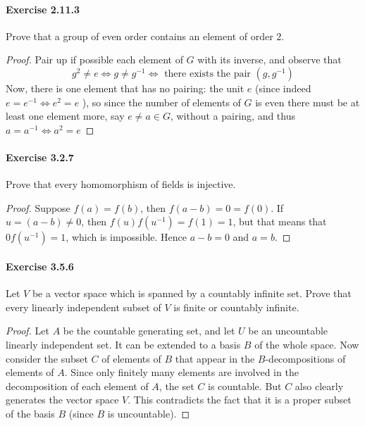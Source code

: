 \documentclass{article}
\begin{document}
\paragraph{Exercise 2.11.3} Prove that a group of even order contains an element of order $2 .$
\begin{proof}
    Pair up if possible each element of $G$ with its inverse, and observe that
$$
g^2 \neq e \Longleftrightarrow g \neq g^{-1} \Longleftrightarrow \text { there exists the pair }\left(g, g^{-1}\right)
$$
Now, there is one element that has no pairing: the unit $e$ (since indeed $e=e^{-1} \Longleftrightarrow e^2=e$ ), so since the number of elements of $G$ is even there must be at least one element more, say $e \neq a \in G$, without a pairing, and thus $a=a^{-1} \Longleftrightarrow a^2=e$
\end{proof}



\paragraph{Exercise 3.2.7} Prove that every homomorphism of fields is injective.
\begin{proof}
    Suppose $f(a)=f(b)$, then $f(a-b)=0=f(0)$. If $u=(a-b) \neq 0$, then $f(u) f\left(u^{-1}\right)=f(1)=1$, but that means that $0 f\left(u^{-1}\right)=1$, which is impossible. Hence $a-b=0$ and $a=b$.
\end{proof}



\paragraph{Exercise 3.5.6} Let $V$ be a vector space which is spanned by a countably infinite set. Prove that every linearly independent subset of $V$ is finite or countably infinite.
\begin{proof}
    Let $A$ be the countable generating set, and let $U$ be an uncountable linearly independent set. It can be extended to a basis $B$ of the whole space. Now consider the subset $C$ of elements of $B$ that appear in the $B$-decompositions of elements of $A$.
Since only finitely many elements are involved in the decomposition of each element of $A$, the set $C$ is countable. But $C$ also clearly generates the vector space $V$. This contradicts the fact that it is a proper subset of the basis $B$ (since $B$ is uncountable).
\end{proof}
\end{document}
